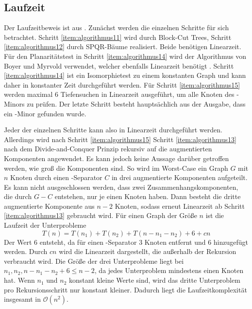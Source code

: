\subsection{Laufzeit}
Der Laufzeitbeweis ist aus \cite{KeM92}.
Zunächst werden die einzelnen Schritte für sich betrachtet.
Schritt \ref{item:algorithmus11} wird durch Block-Cut Trees, Schritt \ref{item:algorithmus12} durch SPQR-Bäume realisiert.
Beide benötigen Linearzeit\cite{HoT73}\cite{GuM00}.
Für den Planaritätstest in Schritt \ref{item:algorithmus14} wird der Algorithmus von Boyer und Myrvold verwendet, welcher ebenfalls Linearzeit benötigt \cite{BoM04}.
Schritt \ref{item:algorithmus14} ist ein Isomorphietest zu einem konstanten Graph und kann daher in konstanter Zeit durchgeführt werden.
Für Schritt \ref{item:algorithmus15} werden maximal 6 Tiefensuchen in Linearzeit ausgeführt, um alle Knoten des \kdd-Minors zu prüfen.
Der letzte Schritt besteht hauptsächlich aus der Ausgabe, dass ein \kf-Minor gefunden wurde.

Jeder der einzelnen Schritte kann also in Linearzeit durchgeführt werden.
Allerdings wird nach Schritt \ref{item:algorithmus15} \ggf Schritt \ref{item:algorithmus13} nach dem Divide-and-Conquer Prinzip rekursiv auf die augmentierten Komponenten angewendet.
Es kann jedoch keine Aussage darüber getroffen werden, wie groß die Komponenten sind.
So wird im Worst-Case ein Graph $G$ mit $n$ Knoten durch einen \dd-Separator $C$ in drei augmentierte Komponenten aufgeteilt.
Es kann nicht ausgeschlossen werden, dass zwei Zusammenhangskomponenten, die durch $G - C$ entstehen, nur je einen Knoten haben.
Dann besteht die dritte augmentierte Komponente aus $n-2$ Knoten, sodass erneut Linearzeit ab Schritt \ref{item:algorithmus13} gebraucht wird.
Für einen Graph der Größe $n$ ist die Laufzeit der Unterprobleme
\begin{equation*}
  T(n) = T(n_1) + T(n_2) + T(n - n_1 - n_2) + 6 + cn
\end{equation*}
Der Wert $6$ entsteht, da für einen \dd-Separator $3$ Knoten entfernt und $6$ hinzugefügt werden.
Durch $cn$ wird die Linearzeit dargestellt, die außerhalb der Rekursion verbraucht wird.
Die Größe der drei Unterprobleme liegt bei $n_1, n_2, n - n_1 - n_2 + 6 \leq n - 2$, da jedes Unterproblem mindestens einen Knoten hat.
Wenn $n_1$ und $n_2$ konstant kleine Werte sind, wird das dritte Unterproblem pro Rekursionsschritt nur konstant kleiner.
Dadurch liegt die Laufzeitkomplexität insgesamt in $\mathcal{O}(n^2)$\cite{KeM92}.
